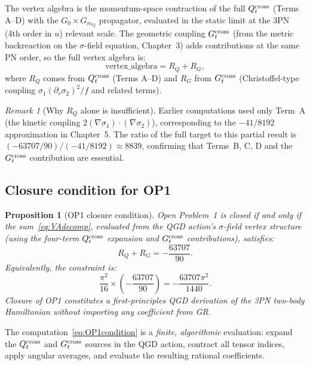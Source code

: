 \documentclass[11pt,a4paper]{article}
\theoremstyle{plain}
\newtheorem{proposition}[theorem]{Proposition}
\theoremstyle{definition}
\theoremstyle{remark}
\newtheorem{remark}[theorem]{Remark}
\newcommand{\mQ}{m_Q}
\begin{document}
The vertex algebra is the momentum-space contraction of the full
$Q_t^{\rm cross}$ (Terms A--D) with the $G_0\times G_{\mQ}$ propagator,
evaluated in the static limit at the 3PN (4th order in $u$) relevant scale.
The geometric coupling $G_t^{\rm cross}$ (from the metric backreaction on
the $\sigma$-field equation, Chapter~3) adds contributions at the same PN
order, so the full vertex algebra is:
\begin{equation}
  \mathrm{vertex\_algebra} = R_Q + R_G,
  \label{eq:VAdecomp}
\end{equation}
where $R_Q$ comes from $Q_t^{\rm cross}$ (Terms A--D) and $R_G$ from
$G_t^{\rm cross}$ (Christoffel-type coupling $\sigma_1(\partial_r\sigma_2)^2/f$
and related terms).

\begin{remark}[Why $R_Q$ alone is insufficient]
Earlier computations used only Term~A (the kinetic coupling
$2(\nabla\sigma_1)\cdot(\nabla\sigma_2)$), corresponding to the
$-41/8192$ approximation in Chapter~5.  The ratio of the full target to
this partial result is $(-63707/90)/(-41/8192) \approx 8839$, confirming
that Terms~B, C, D and the $G_t^{\rm cross}$ contribution are essential.
\end{remark}

\subsection{Closure condition for OP1}

\begin{proposition}[OP1 closure condition]
\label{prop:OP1}
Open Problem~1 is closed if and only if the sum~\eqref{eq:VAdecomp},
evaluated from the QGD action's $\sigma$-field vertex structure (using
the four-term $Q_t^{\rm cross}$ expansion and $G_t^{\rm cross}$
contributions), satisfies:
\begin{equation}
  R_Q + R_G = -\frac{63707}{90}.
  \label{eq:OP1condition}
\end{equation}
Equivalently, the constraint is:
\begin{equation}
  \frac{\pi^2}{16}\times\!\left(-\frac{63707}{90}\right)
  = -\frac{63707\pi^2}{1440}.
  \label{eq:OP1_check}
\end{equation}
Closure of OP1 constitutes a first-principles QGD derivation of the
3PN two-body Hamiltonian without importing any coefficient from GR.
\end{proposition}

The computation~\eqref{eq:OP1condition} is a \emph{finite, algorithmic}
evaluation: expand the $Q_t^{\rm cross}$ and $G_t^{\rm cross}$ sources
in the QGD action, contract all tensor indices, apply angular averages,
and evaluate the resulting rational coefficients.
\end{document}
